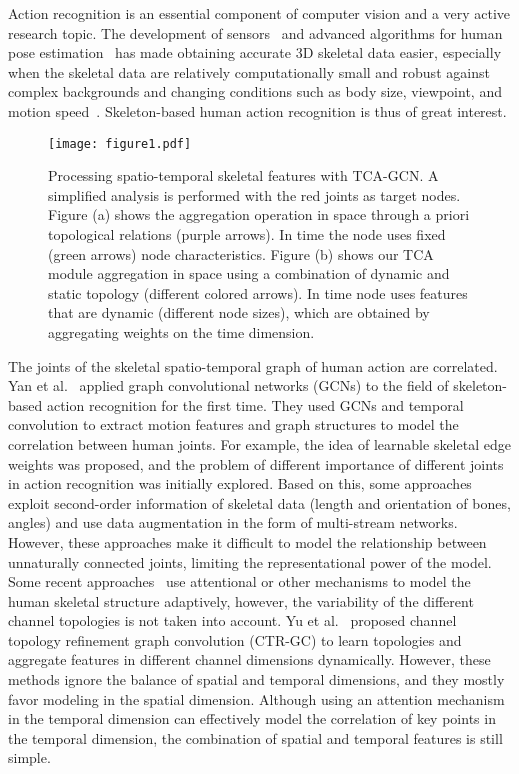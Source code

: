 \documentclass[letterpaper]{article} \usepackage[submission]{aaai23}  \usepackage{times}  \usepackage{helvet}  \usepackage{courier}  \usepackage[hyphens]{url}  \usepackage{graphicx} \urlstyle{rm} \def\UrlFont{\rm}  \usepackage{natbib}  \usepackage{caption} \frenchspacing  \setlength{\pdfpagewidth}{8.5in} \setlength{\pdfpageheight}{11in} \usepackage{algorithm}
\begin{document}
Action recognition is an essential component of computer vision and a very active research topic. The development of sensors~\cite{2016NTU, 2020NTU} and advanced algorithms for human pose estimation~\cite{2017RMPE, CaoZhe0OpenPose} has made obtaining accurate 3D skeletal data easier, especially when the skeletal data are relatively computationally small and robust against complex backgrounds and changing conditions such as body size, viewpoint, and motion speed~\cite{DBLP:conf/aaai/YanXL18, 2020sttr, 20133D, 2017Going}. Skeleton-based human action recognition is thus of great interest.
\begin{figure}[t] 
\centering 
\texttt{[image: figure1.pdf]} 
\caption{Processing spatio-temporal skeletal features with TCA-GCN. A simplified analysis is performed with the red joints as target nodes. Figure (a) shows the aggregation operation in space through a priori topological relations (purple arrows). In time the node uses fixed (green arrows) node characteristics. Figure (b) shows our TCA module aggregation in space using a combination of dynamic and static topology (different colored arrows). In time  node uses features that are dynamic (different node sizes), which are obtained by aggregating weights on the time dimension.} 
\label{fig11} 
\end{figure}
The joints of the skeletal spatio-temporal graph of human action are correlated. Yan et al.~\cite{DBLP:conf/aaai/YanXL18} applied graph convolutional networks (GCNs) to the field of skeleton-based action recognition for the first time. They used GCNs and temporal convolution to extract motion features and graph structures to model the correlation between human joints. For example, the idea of learnable skeletal edge weights was proposed, and the problem of different importance of different joints in action recognition was initially explored. Based on this, some approaches~\cite{2018Two, 2020Skeletonshift, qin2021fusing} exploit second-order information of skeletal data (length and orientation of bones, angles) and use data augmentation in the form of multi-stream networks. However, these approaches make it difficult to model the relationship between unnaturally connected joints, limiting the representational power of the model. Some recent approaches~\cite{2018Two, 2020sttr, 2019Semantics,peng2020learning} use attentional or other mechanisms to model the human skeletal structure adaptively, however, the variability of the different channel topologies is not taken into account.
Yu et al.~\cite{2021Channel} proposed channel topology refinement graph convolution (CTR-GC) to learn topologies and aggregate features in different channel dimensions dynamically. However, these methods ignore the balance of spatial and temporal dimensions, and they mostly favor modeling in the spatial dimension. Although using an attention mechanism in the temporal dimension can effectively model the correlation of key points in the temporal dimension, the combination of spatial and temporal features is still simple.
\end{document}
